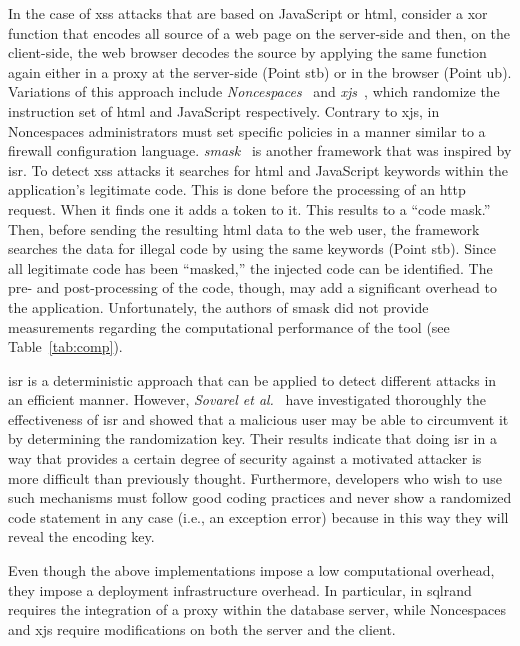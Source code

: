 \documentclass[conference]{IEEEtran}
\begin{document}
In the case of {\sc xss} attacks that are based on JavaScript or {\sc
  html}, consider a {\sc xor} function that encodes all source of a
web page on the server-side and then, on the client-side, the web
browser decodes the source by applying the same function again either
in a proxy at the server-side (Point {\sc s}t{\sc b}) or in the browser
(Point {\sc ub}). Variations of this approach include {\it
  Noncespaces}~\cite{GC09} and {\it x{\sc js}}~\cite{APKLM10}, which
randomize the instruction set of {\sc html} and JavaScript
respectively. Contrary to x{\sc js}, in Noncespaces administrators
must set specific policies in a manner similar to a firewall
configuration language. {\it {\sc sm}ask}~\cite{JB07} is another
framework that was inspired by {\sc isr}. To detect {\sc xss}
attacks it searches for {\sc html} and
JavaScript keywords within the application's legitimate code. This is
done before the processing of an {\sc http} request. When it finds one
it adds a token to it. This results to a ``code mask.'' Then, before
sending the resulting {\sc html} data to the web user, the framework
searches the data for illegal code by using the same keywords (Point
{\sc s}t{\sc b}). Since all legitimate code has been ``masked,'' the injected
code can be identified. The pre- and post-processing of the code,
though, may add a significant overhead to the application.
Unfortunately, the authors of {\sc sm}ask did not provide measurements
regarding the computational performance of the tool (see
Table~\ref{tab:comp}).

{\sc isr} is a deterministic approach that can be applied to detect
different attacks in an efficient manner. However, {\it Sovarel et
al.}~\cite{SEP05} have investigated thoroughly the effectiveness of
{\sc isr} and showed that a malicious user may be able to circumvent
it by determining the randomization key. Their results indicate
that doing {\sc isr} in a way that provides a certain degree of
security against a motivated attacker is more difficult than
previously thought. Furthermore, developers who wish to use such
mechanisms must follow good coding practices and never show a
randomized code statement in any case (i.e., an exception error)
because in this way they will reveal the encoding key.

Even though the above implementations impose a low computational
overhead, they impose a deployment infrastructure overhead. In particular, in
{\sc sql}rand requires the integration of a proxy within the database
server, while Noncespaces and x{\sc js} require modifications on both
the server and the client.
\end{document}
